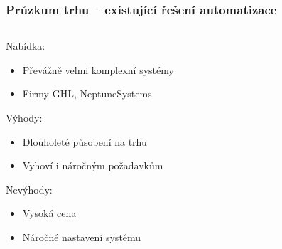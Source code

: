 \documentclass[%
  12pt,       				%
	t,                  %
	aspectratio=1610,   %
	unicode,						%
]{beamer}				    	%
\begin{document}

\begin{frame}[fragile]
	\frametitle{Průzkum trhu -- existující řešení automatizace}
	
	\begin{columns}[T] 								%
		\begin{column}{0.5\textwidth}		%
			Nabídka:\\[1ex]
			\begin{itemize}
				\item Převážně velmi komplexní systémy
				\item Firmy GHL, NeptuneSystems
			\end{itemize}

			\vspace{1.5ex}%
			Výhody:\\[1ex]
			\begin{itemize}
				\item Dlouholeté působení na trhu 
				\item Vyhoví i náročným požadavkům
			\end{itemize}
			
			\vspace{1.5ex}%
			Nevýhody:\\[1ex]
			\begin{itemize}
				\item Vysoká cena 
				\item Náročné nastavení systému
			\end{itemize}
			

\end{column}
\end{columns}
\end{frame}
\end{document}
